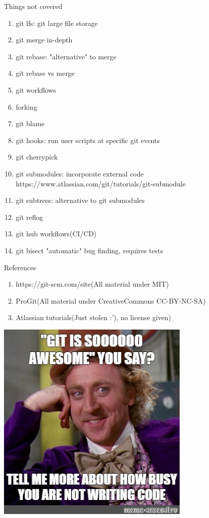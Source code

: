 \documentclass{beamer}
\begin{document}
\begin{frame}[fragile,t]{Things not covered}\vspace{10pt}
  \begin{enumerate}
    \item git lfs: git large file storage
    \item git merge in-depth
    \item git rebase: "alternative" to merge
    \item git rebase vs merge
    \item git workflows
    \item forking 
    \item git blame
    \item git hooks: run user scripts at specific git events
    \item git cherrypick
    \item git submodules: incorporate external code https://www.atlassian.com/git/tutorials/git-submodule
    \item git subtrees: alternative to git submodules
    \item git reflog
    \item git hub workflows(CI/CD)
    \item git bisect  "automatic" bug finding, requires tests
  \end{enumerate}
\end{frame}

\begin{frame}[fragile,t]{References}\vspace{10pt}
  \begin{enumerate}
    \item https://git-scm.com/site(All material under MIT)
    \item ProGit(All material under CreativeCommons CC-BY-NC-SA)
    \item Atlassian tutorials(Just stolen :'), no license given)
  \end{enumerate}
\end{frame}

\begin{frame}
  \centering
      \includegraphics[width=0.7\textwidth,height=0.7\textheight]{memes/git_awesome.jpg}
\end{frame}
\end{document}
